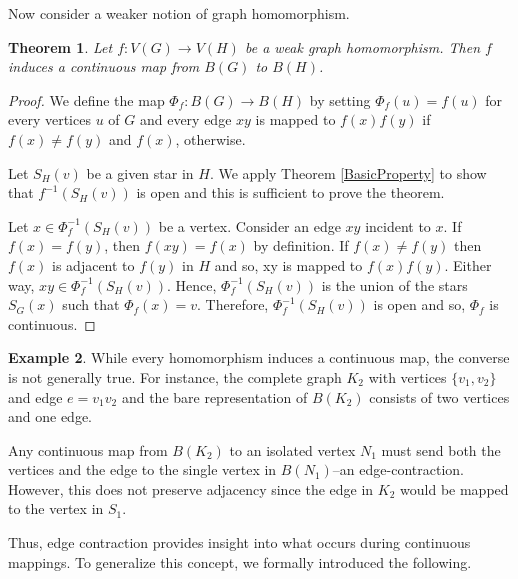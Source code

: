 \documentclass{amsart}
\newtheorem{theorem}{Theorem}[section]
\theoremstyle{definition}
\newtheorem{example}[theorem]{Example}
\theoremstyle{remark}
\numberwithin{equation}{section}
\begin{document}
	Now consider a weaker notion of graph homomorphism.
	
	\begin{theorem}
		\label{WeakHomomorphismareContinuousVertexMap}
		Let \(f:V(G) \rightarrow V(H)\) be a weak graph homomorphism. Then \(f\) induces a continuous map from \(B(G)\) to \(B(H)\).
	\end{theorem}
	\begin{proof}
		We define the map \(\Phi_f:B(G) \rightarrow B(H)\) by setting \(\Phi_f(u) = f(u)\) for every vertices \(u\) of \(G\) and every edge \(xy\) is mapped to \(f(x)f(y)\) if \(f(x) \neq f(y)\) and \(f(x)\), otherwise.
		
		Let \(S_H(v)\) be a given star in \(H\). We apply Theorem \ref{BasicProperty} to show that \(f^{-1}(S_H(v))\) is open and this is sufficient to prove the theorem.
		
		Let \(x \in \Phi_f^{-1}(S_H(v))\) be a vertex. Consider an edge \(xy\) incident to \(x\). If \(f(x) = f(y)\), then \(f(xy) = f(x)\) by definition. If \(f(x) \neq f(y)\) then \(f(x)\) is adjacent to \(f(y)\) in \(H\) and so, xy is mapped to \(f(x)f(y)\). Either way, \(xy \in \Phi_f^{-1}(S_H(v))\). Hence, \(\Phi_f^{-1}(S_H(v))\) is the union of the stars \(S_G(x)\) such that \(\Phi_f(x) = v\). Therefore, \(\Phi_f^{-1}(S_H(v))\) is open and so, \(\Phi_f\) is continuous.
	\end{proof}
	
	\begin{example}
		While every homomorphism induces a continuous map, the converse is not generally true. For instance, the complete graph \( K_2 \) with vertices \(\{v_1,v_2\}\) and edge \( e =	v_1 v_2 \) and the bare representation of \( B(K_2) \) consists of two vertices and one edge. 
		
		Any continuous map from \( B(K_2) \) to an isolated vertex \( N_1 \) must send both the vertices and the edge to the single vertex in \( B(N_1) \)--an edge-contraction. However, this does not preserve adjacency since the edge in \( K_2 \) would be mapped to the vertex in \( S_1 \).
	\end{example}
	
	Thus, edge contraction provides insight into what occurs during continuous mappings. To generalize this concept, we formally introduced the following.
	
\end{document}
